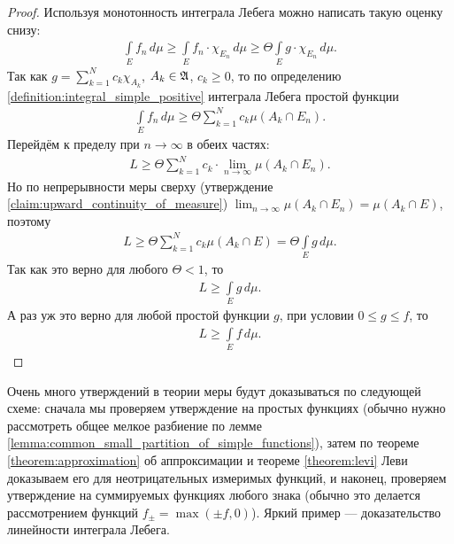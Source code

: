 \begin{proof}
 Используя монотонность интеграла Лебега можно написать такую оценку снизу:
 \begin{align*}
  \int\limits_E f_n \, d\mu \geqslant \int\limits_{E} f_n \cdot \chi_{E_n} \, d\mu \geqslant \Theta \int\limits_E g \cdot \chi_{E_n} \, d\mu
  .\end{align*} Так как $g = \sum_{k=1}^{N} c_k \chi_{A_k}$, $A_k \in \mathfrak{A}$, $c_k \geqslant 0$, то по определению \ref{definition:integral_simple_positive} интеграла Лебега простой функции \begin{align*}
  \int\limits_E f_n \, d\mu \geqslant \Theta \sum_{k=1}^{N} c_k \mu (A_k \cap E_n)
  .\end{align*} Перейдём к пределу при $n \to \infty$ в обеих частях:
  \begin{align*}
   L \geqslant \Theta \sum_{k=1}^{N} c_k \cdot \lim_{n \to \infty} \mu(A_k \cap E_n)
  .\end{align*} Но по непрерывности меры сверху (утверждение \ref{claim:upward_continuity_of_measure}) $\lim_{n \to \infty} \mu(A_k \cap E_n) = \mu(A_k \cap E) $, поэтому
  \begin{align*}
   L \geqslant \Theta \sum_{k=1}^{N} c_k \mu(A_k \cap E) = \Theta \int\limits_{E} g \, d\mu 
  .\end{align*} Так как это верно для любого $\Theta < 1$, то
  \begin{align*}
   L \geqslant \int\limits_{E} g \, d\mu 
  .\end{align*} А раз уж это верно для любой простой функции $g$, при условии $0 \leqslant g \leqslant f$, то
  \begin{align*}
   L \geqslant \int\limits_{E} f \, d\mu 
  .\end{align*} 
\end{proof}

Очень много утверждений в теории меры будут доказываться по следующей схеме: сначала мы проверяем утверждение на простых функциях (обычно нужно рассмотреть общее мелкое разбиение по лемме \ref{lemma:common_small_partition_of_simple_functions}), затем по теореме \ref{theorem:approximation} об аппроксимации и теореме \ref{theorem:levi} Леви доказываем его для неотрицательных измеримых  функций, и наконец, проверяем утверждение на суммируемых функциях любого знака (обычно это делается рассмотрением функций $f_{\pm} = \max(\pm f, 0)$). Яркий пример --- доказательство линейности интеграла Лебега. 

